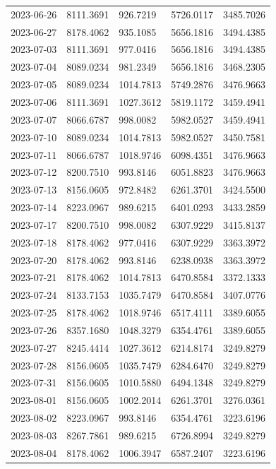 \begin{footnotesize}
\begin{longtable}{lllll}
2023-06-26 & 8111.3691 & 926.7219 & 5726.0117 & 3485.7026 \\
2023-06-27 & 8178.4062 & 935.1085 & 5656.1816 & 3494.4385 \\
2023-07-03 & 8111.3691 & 977.0416 & 5656.1816 & 3494.4385 \\
2023-07-04 & 8089.0234 & 981.2349 & 5656.1816 & 3468.2305 \\
2023-07-05 & 8089.0234 & 1014.7813 & 5749.2876 & 3476.9663 \\
2023-07-06 & 8111.3691 & 1027.3612 & 5819.1172 & 3459.4941 \\
2023-07-07 & 8066.6787 & 998.0082 & 5982.0527 & 3459.4941 \\
2023-07-10 & 8089.0234 & 1014.7813 & 5982.0527 & 3450.7581 \\
2023-07-11 & 8066.6787 & 1018.9746 & 6098.4351 & 3476.9663 \\
2023-07-12 & 8200.7510 & 993.8146 & 6051.8823 & 3476.9663 \\
2023-07-13 & 8156.0605 & 972.8482 & 6261.3701 & 3424.5500 \\
2023-07-14 & 8223.0967 & 989.6215 & 6401.0293 & 3433.2859 \\
2023-07-17 & 8200.7510 & 998.0082 & 6307.9229 & 3415.8137 \\
2023-07-18 & 8178.4062 & 977.0416 & 6307.9229 & 3363.3972 \\
2023-07-20 & 8178.4062 & 993.8146 & 6238.0938 & 3363.3972 \\
2023-07-21 & 8178.4062 & 1014.7813 & 6470.8584 & 3372.1333 \\
2023-07-24 & 8133.7153 & 1035.7479 & 6470.8584 & 3407.0776 \\
2023-07-25 & 8178.4062 & 1018.9746 & 6517.4111 & 3389.6055 \\
2023-07-26 & 8357.1680 & 1048.3279 & 6354.4761 & 3389.6055 \\
2023-07-27 & 8245.4414 & 1027.3612 & 6214.8174 & 3249.8279 \\
2023-07-28 & 8156.0605 & 1035.7479 & 6284.6470 & 3249.8279 \\
2023-07-31 & 8156.0605 & 1010.5880 & 6494.1348 & 3249.8279 \\
2023-08-01 & 8156.0605 & 1002.2014 & 6261.3701 & 3276.0361 \\
2023-08-02 & 8223.0967 & 993.8146 & 6354.4761 & 3223.6196 \\
2023-08-03 & 8267.7861 & 989.6215 & 6726.8994 & 3249.8279 \\
2023-08-04 & 8178.4062 & 1006.3947 & 6587.2407 & 3223.6196 \\

\end{longtable}
\end{footnotesize}
